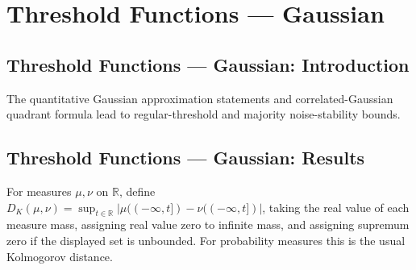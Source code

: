 \section{Threshold Functions --- Gaussian}
\subsection*{Threshold Functions --- Gaussian: Introduction}
The quantitative Gaussian approximation statements and correlated-Gaussian quadrant formula lead to regular-threshold and majority noise-stability bounds.

\subsection*{Threshold Functions --- Gaussian: Results}

\begin{definition}
\leanok
For measures $\mu,\nu$ on $\mathbb R$, define $D_K(\mu,\nu)=\sup_{t\in\mathbb R}|\mu(({-\infty},t])-\nu(({-\infty},t])|$, taking the real value of each measure mass, assigning real value zero to infinite mass, and assigning supremum zero if the displayed set is unbounded. For probability measures this is the usual Kolmogorov distance.
\end{definition}


